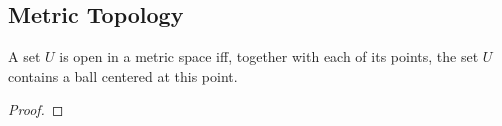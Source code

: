 \subsection{Metric Topology}

\begin{majorEx}%

\end{majorEx}

\begin{majorEx}%

\end{majorEx}

\begin{majorEx}%
  A set $U$ is open in a metric space iff, together
  with each of its points, the set $U$ contains a
  ball centered at this point.
\end{majorEx}

\begin{proof}

\end{proof}